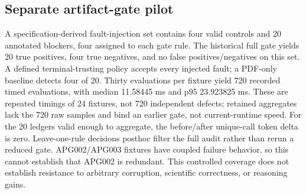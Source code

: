 \subsection{Separate artifact-gate pilot}
A specification-derived fault-injection set contains four valid controls and 20 annotated blockers, four assigned to each gate rule. The historical full gate yields 20 true positives, four true negatives, and no false positives/negatives on this set. A defined terminal-trusting policy accepts every injected fault; a PDF-only baseline detects four of 20. Thirty evaluations per fixture yield 720 recorded timed evaluations, with median 11.58445 ms and p95 23.923825 ms. These are repeated timings of 24 fixtures, not 720 independent defects; retained aggregates lack the 720 raw samples and bind an earlier gate, not current-runtime speed. For the 20 ledgers valid enough to aggregate, the before/after unique-call token delta is zero. Leave-one-rule decisions posthoc filter the full audit rather than rerun a reduced gate. APG002/APG003 fixtures have coupled failure behavior, so this cannot establish that APG002 is redundant. This controlled coverage does not establish resistance to arbitrary corruption, scientific correctness, or reasoning gains.
